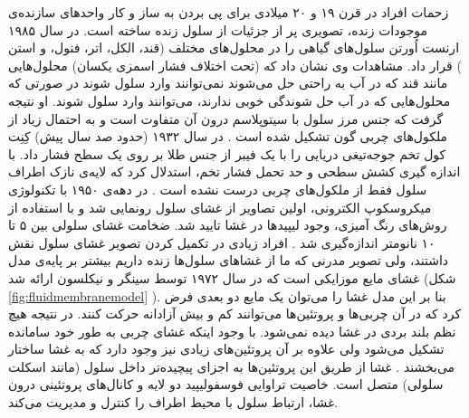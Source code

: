 زحمات افراد در قرن ۱۹ و ۲۰ میلادی برای پی بردن به ساز و کار واحد‌های سازنده‌ی موجودات زنده، تصویری پر از جزئیات از سلول زنده ساخته است. در سال ۱۹۸۵ ارنست اُورتن 
سلول‌های گیاهی را در محلول‌های مختلف (قند،‌ الکل، اتر، فنول، و استن
) قرار داد. مشاهدات وی نشان داد که (تحت اختلاف فشار اسمزی یکسان) محلول‌هایی مانند قند که در آب به راحتی حل می‌شوند نمی‌توانند وارد سلول شوند در صورتی که محلول‌هایی که در آب حل شوندگی خوبی ندارند، می‌توانند وارد سلول شوند. او نتیجه گرفت که جنس مرز سلول با سیتوپلاسم درون آن متفاوت است و به احتمال زیاد از ملکول‌های چربی گون تشکیل شده است
\cite{overton1985}
. در سال ۱۹۳۲ (حدود صد سال پیش) کِنِت کول
 تخم جوجه‌تیغی دریایی
 را با یک فیبر از جنس طلا بر روی یک سطح فشار داد. با اندازه گیری  کشش سطحی و حد تحمل فشار تخم، استدلال کرد که لایه‌ی نازک اطراف سلول فقط از ملکول‌های چربی درست نشده است
 \cite{Cole1932}
. در دهه‌ی ۱۹۵۰ با تکنولوژی میکروسکوپ الکترونی، اولین تصاویر از غشای سلول رونمایی شد و با استفاده از روش‌های رنگ آمیزی، وجود لیپید‌ها
 در غشا تایید شد. 
ضخامت غشای سلولی بین ۵ تا ۱۰ نانومتر اندازه‌گیری شد
\cite{ROBERTSON1959aa}
. افراد زیادی در تکمیل‌ کردن تصویر غشای سلول  نقش داشتند، ولی تصویر مدرنی که ما از غشاهای سلول‌ها زنده داریم بیشتر بر پایه‌ی مدل غشای مایع موزایکی‌
 است که در سال ۱۹۷۲ توسط سینگر
  و نیکلسون
 ارائه شد
\cite{Singer1972}
(شکل 
\ref{fig:fluidmembranemodel}
). بنا بر این مدل غشا را می‌توان یک مایع دو بعدی فرض کرد که در آن چربی‌ها و پروتئین‌ها می‌توانند کم و بیش آزادانه حرکت کنند. در نتیجه هیچ نظم بلند بردی در غشا دیده نمی‌شود. با وجود اینکه غشای چربی به طور خود سامانده تشکیل می‌شود ولی علاوه بر آن پروتئین‌های زیادی نیز وجود دارد که به غشا ساختار می‌بخشند
\cite{wikiCellMembrane}
. غشا از طریق این پروتئین‌ها به اجزای پیچیده‌تر داخل سلول (مانند اسکلت سلولی) متصل است. خاصیت تراوایی فوسفولیپید دو لایه و کانال‌های پروتئینی درون غشا، ارتباط سلول با محیط اطراف را کنترل و مدیریت می‌کند. 







 
 

